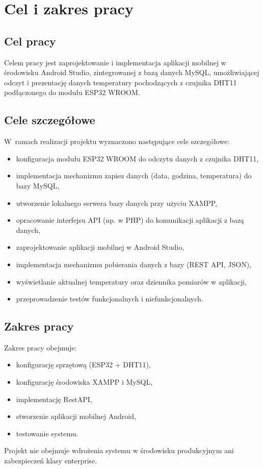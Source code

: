 \chapter{Cel i zakres pracy}

\section{Cel pracy}
Celem pracy jest zaprojektowanie i implementacja aplikacji mobilnej w środowisku Android Studio, zintegrowanej z bazą danych MySQL, umożliwiającej odczyt i prezentację danych temperatury pochodzących z czujnika DHT11 podłączonego do modułu ESP32 WROOM.

\section{Cele szczegółowe}
W~ramach realizacji projektu wyznaczono następujące cele szczegółowe:
\begin{itemize}
    \item konfiguracja modułu ESP32 WROOM do odczytu danych z czujnika DHT11,
    \item implementacja mechanizmu zapisu danych (data, godzina, temperatura) do bazy MySQL,
    \item utworzenie lokalnego serwera bazy danych przy użyciu XAMPP,
    \item opracowanie interfejsu API (np. w PHP) do komunikacji aplikacji z bazą danych,
    \item zaprojektowanie aplikacji mobilnej w Android Studio,
    \item implementacja mechanizmu pobierania danych z bazy (REST API, JSON),
    \item wyświetlanie aktualnej temperatury oraz dziennika pomiarów w aplikacji,
    \item przeprowadzenie testów funkcjonalnych i niefunkcjonalnych.
\end{itemize}

\section{Zakres pracy}
Zakres pracy obejmuje:
\begin{itemize}
    \item konfigurację sprzętową (ESP32 + DHT11),
    \item konfigurację środowiska XAMPP i MySQL,
    \item implementację RestAPI,
    \item stworzenie aplikacji mobilnej Android,
    \item testowanie systemu.
\end{itemize}
Projekt nie obejmuje wdrożenia systemu w środowisku produkcyjnym ani zabezpieczeń klasy enterprise.

